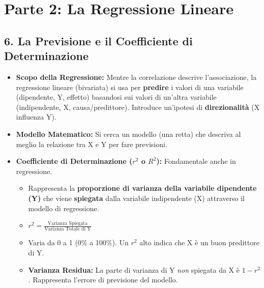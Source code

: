 \documentclass[12pt, a4paper]{article}
\newcommand{\rsq}{r^2} %
\newcommand{\Rsq}{R^2} %
\begin{document}
\clearpage %

\section*{Parte 2: La Regressione Lineare}

\subsection*{6. La Previsione e il Coefficiente di Determinazione}
\begin{itemize}
    \item \textbf{Scopo della Regressione:} Mentre la correlazione descrive l'associazione, la regressione lineare (bivariata) si usa per \textbf{predire} i valori di una variabile (dipendente, Y, effetto) basandosi sui valori di un'altra variabile (indipendente, X, causa/predittore). Introduce un'ipotesi di \textbf{direzionalità} (X influenza Y).
    \item \textbf{Modello Matematico:} Si cerca un modello (una retta) che descriva al meglio la relazione tra X e Y per fare previsioni.
    \item \textbf{Coefficiente di Determinazione ($\rsq$ o $\Rsq$):} Fondamentale anche in regressione.
        \begin{itemize}
            \item Rappresenta la \textbf{proporzione di varianza della variabile dipendente (Y)} che viene \textbf{spiegata} dalla variabile indipendente (X) attraverso il modello di regressione.
            \item $\rsq = \frac{\text{Varianza Spiegata}}{\text{Varianza Totale di Y}}$
            \item Varia da 0 a 1 (0\% a 100\%). Un $\rsq$ alto indica che X è un buon predittore di Y.
            \item \textbf{Varianza Residua:} La parte di varianza di Y \textit{non} spiegata da X è $1 - \rsq$. Rappresenta l'errore di previsione del modello.
        \end{itemize}
\end{itemize}

\begin{center}
\end{center}
\end{document}
